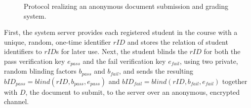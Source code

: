 \begin{figure}[p]
\begin{msc}{}
				\nextlevel[1]

				\nextlevel[3]

				\nextlevel[1]
		\nextlevel[1.5]

		\nextlevel[1]

		\nextlevel[3.5]

		\nextlevel[1]

		\nextlevel[3.5]

	\end{msc}

	\caption{Protocol realizing an anonymous document submission and grading system.} 
	\label{figure:document-submission-system:sequencediagram}
\end{figure}%
%
First, the system server provides each registered student in the course
with a unique, random, one-time identifier $rID$ and stores the relation
of student identifiers to $rID$s for later use.
Next, the student blinds the $rID$ for both the pass verification key
$e_{pass}$ and the fail verification key $e_{fail}$, using two private,
random blinding factors $b_{pass}$ and $b_{fail}$, and sends the
resulting $bID_{pass} = blind(rID,b_{pass},e_{pass})$ and $bID_{fail} =
blind(rID,b_{fail},e_{fail})$ together with $D$, the document to submit,
to the server over an anonymous, encrypted channel. %
